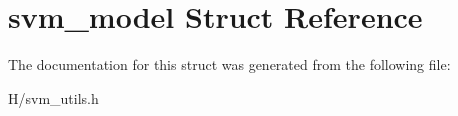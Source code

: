 \hypertarget{structsvm__model}{
\section{svm\_\-model Struct Reference}
\label{structsvm__model}
}


The documentation for this struct was generated from the following file:\begin{DoxyCompactItemize}
\item 
H/svm\_\-utils.h\end{DoxyCompactItemize}

